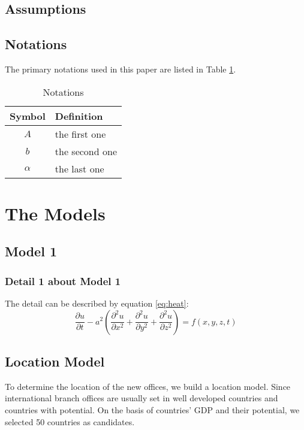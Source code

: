 \documentclass[12pt]{article}  %
\begin{document}
\subsection{Assumptions}

\subsection{Notations}
The primary notations used in this paper are listed in Table \ref{tb:notation}.
\begin{table}[!htbp]
\begin{center}
\caption{Notations}
\begin{tabular}{cl}
	\toprule
	\multicolumn{1}{m{3cm}}{\centering Symbol}
	&\multicolumn{1}{m{8cm}}{\centering Definition}\\
	\midrule
	$A$&the first one\\
	$b$&the second one\\
	$\alpha$ &the last one\\
	\bottomrule
\end{tabular}\label{tb:notation}
\end{center}
\end{table}

\section{The Models}
\subsection{Model 1}
\subsubsection{Detail 1 about Model 1}
The detail can be described by equation \eqref{eq:heat}:
\begin{equation}\label{eq:heat}
\frac{\partial u}{\partial t} - a^2 \left( \frac{\partial^2 u}{\partial x^2} + \frac{\partial^2 u}{\partial y^2} + \frac{\partial^2 u}{\partial z^2} \right) = f(x, y, z, t)
\end{equation}

\subsection{Location Model}
To determine the location of the new offices, we build a location model. Since international branch offices are usually set in well developed countries and countries with potential. On the basis of countries' GDP and their potential, we selected 50 countries as candidates. 
\end{document}
